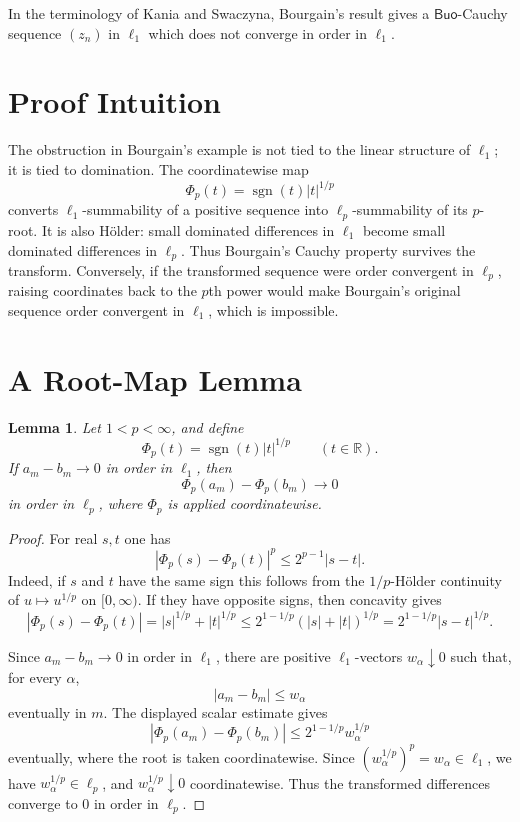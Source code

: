 \documentclass[11pt]{article}
\newtheorem{lemma}{Lemma}
\newcommand{\Buo}{\mathsf{Buo}}
\newcommand{\sgn}{\operatorname{sgn}}
\begin{document}
In the terminology of Kania and Swaczyna, Bourgain's result gives a
\(\Buo\)-Cauchy sequence \((z_n)\) in \(\ell_1\) which does not converge in
order in \(\ell_1\).

\section*{Proof Intuition}

The obstruction in Bourgain's example is not tied to the linear structure of
\(\ell_1\); it is tied to domination.  The coordinatewise map
\[
        \Phi_p(t)=\sgn(t)|t|^{1/p}
\]
converts \(\ell_1\)-summability of a positive sequence into
\(\ell_p\)-summability of its \(p\)-root.  It is also Hölder:
small dominated differences in \(\ell_1\) become small dominated differences
in \(\ell_p\).  Thus Bourgain's Cauchy property survives the transform.
Conversely, if the transformed sequence were order convergent in \(\ell_p\),
raising coordinates back to the \(p\)th power would make Bourgain's original
sequence order convergent in \(\ell_1\), which is impossible.

\section*{A Root-Map Lemma}

\begin{lemma}\label{lem:root-preserves-cauchy}
Let \(1<p<\infty\), and define
\[
        \Phi_p(t)=\sgn(t)|t|^{1/p}\qquad(t\in\mathbb R).
\]
If \(a_m-b_m\to0\) in order in \(\ell_1\), then
\[
        \Phi_p(a_m)-\Phi_p(b_m)\to0
\]
in order in \(\ell_p\), where \(\Phi_p\) is applied coordinatewise.
\end{lemma}

\begin{proof}
For real \(s,t\) one has
\[
        |\Phi_p(s)-\Phi_p(t)|^p \le 2^{p-1}|s-t|.
\]
Indeed, if \(s\) and \(t\) have the same sign this follows from the
\(1/p\)-Hölder continuity of \(u\mapsto u^{1/p}\) on \([0,\infty)\).  If they
have opposite signs, then concavity gives
\[
|\Phi_p(s)-\Phi_p(t)|
        = |s|^{1/p}+|t|^{1/p}
        \le 2^{1-1/p}(|s|+|t|)^{1/p}
        = 2^{1-1/p}|s-t|^{1/p}.
\]

Since \(a_m-b_m\to0\) in order in \(\ell_1\), there are positive
\(\ell_1\)-vectors \(w_\alpha\downarrow0\) such that, for every \(\alpha\),
\[
        |a_m-b_m|\le w_\alpha
\]
eventually in \(m\).  The displayed scalar estimate gives
\[
        |\Phi_p(a_m)-\Phi_p(b_m)|
        \le 2^{1-1/p} w_\alpha^{1/p}
\]
eventually, where the root is taken coordinatewise.  Since
\((w_\alpha^{1/p})^p=w_\alpha\in\ell_1\), we have
\(w_\alpha^{1/p}\in\ell_p\), and \(w_\alpha^{1/p}\downarrow0\) coordinatewise.
Thus the transformed differences converge to \(0\) in order in \(\ell_p\).
\end{proof}
\end{document}
